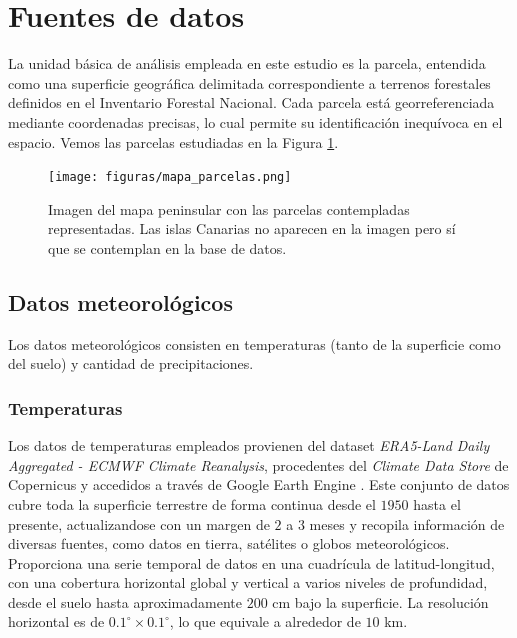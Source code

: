 \section{Fuentes de datos}

La unidad básica de análisis empleada en este estudio es la parcela, entendida como una superficie geográfica delimitada correspondiente a terrenos forestales definidos en el Inventario Forestal Nacional. Cada parcela está georreferenciada mediante coordenadas precisas, lo cual permite su identificación inequívoca en el espacio. Vemos las parcelas estudiadas en la Figura \ref{fig:parcelas}.

\begin{figure}[H]
    \centering
    \texttt{[image: figuras/mapa\_parcelas.png]}
    \caption{\small Imagen del mapa peninsular con las parcelas contempladas representadas. Las islas Canarias no aparecen en la imagen pero sí que se contemplan en la base de datos.}
    \label{fig:parcelas}
\end{figure}

\subsection{Datos meteorológicos}
Los datos meteorológicos consisten en temperaturas (tanto de la superficie como del suelo) y cantidad de precipitaciones.

\subsubsection*{Temperaturas}

Los datos de temperaturas empleados provienen del dataset \textit{ERA5-Land Daily Aggregated - ECMWF Climate Reanalysis}, procedentes del \textit{Climate Data Store} de Copernicus \cite{copernicus_api} y accedidos a través de Google Earth Engine \cite{copernicus_era5_land_daily}. Este conjunto de datos cubre toda la superficie terrestre de forma continua desde el $1950$ hasta el presente, actualizandose con un margen de $2$ a $3$ meses y recopila información de diversas fuentes, como datos en tierra, satélites o globos meteorológicos. Proporciona una serie temporal de datos en una cuadrícula de latitud-longitud, con una cobertura horizontal global y vertical a varios niveles de profundidad, desde el suelo hasta aproximadamente $200$ cm bajo la superficie. La resolución horizontal es de $0.1^\circ \times 0.1^\circ$, lo que equivale a alrededor de $10$ km.

\medskip

